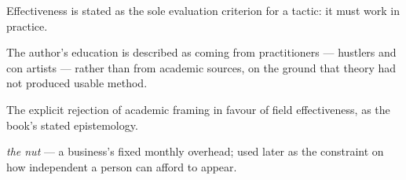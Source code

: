 

\begin{distilled}
  \item Effectiveness is stated as the sole evaluation criterion for a tactic: it must work in practice.
  \item The author's education is described as coming from practitioners --- hustlers and con artists --- rather than from academic sources, on the ground that theory had not produced usable method.
\end{distilled}

\begin{unique}
  \item The explicit rejection of academic framing in favour of field effectiveness, as the book's stated epistemology.
\end{unique}

\begin{terms}
  \item \emph{the nut} --- a business's fixed monthly overhead; used later as the constraint on how independent a person can afford to appear.
\end{terms}
